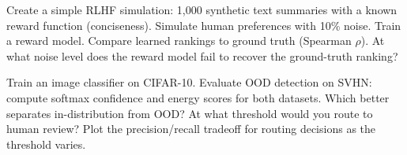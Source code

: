 \begin{Exercise}
Create a simple RLHF simulation: 1{,}000 synthetic text summaries with a known reward function (conciseness). Simulate human preferences with 10\% noise. Train a reward model. Compare learned rankings to ground truth (Spearman $\rho$). At what noise level does the reward model fail to recover the ground-truth ranking?
\end{Exercise}

\begin{Exercise}
Train an image classifier on CIFAR-10. Evaluate OOD detection on SVHN: compute softmax confidence and energy scores for both datasets. Which better separates in-distribution from OOD? At what threshold would you route to human review? Plot the precision/recall tradeoff for routing decisions as the threshold varies.
\end{Exercise}
\apxnumoff
